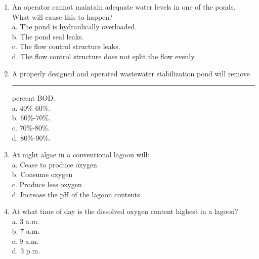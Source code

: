 \begin{tcolorbox}[breakable, enhanced,
colframe=blue!25,
colback=blue!10,
coltitle=blue!20!black,  
title= Chapter Assessment]
\begin{enumerate}
e. None of the above. \\


\item  An operator cannot maintain adequate water levels in one of the ponds. What will cause this to happen? \\


a. The pond is hydraulically overloaded. \\

b. The pond seal leaks. \\

c. The flow control structure leaks. \\

d. The flow control structure does not split the flow evenly. \\


\item  A properly designed and operated wastewater stabilization pond will remove \rule{1.5cm}{0.3mm} percent BOD. \\


a. 40\%-60\%. \\

b. 60\%-70\%. \\

c. 70\%-80\%. \\

d. 80\%-90\%. \\


\item  At night algae in a conventional lagoon will: \\


a. Cease to produce oxygen \\

b. Consume oxygen \\

c. Produce less oxygen \\

d. Increase the pH of the lagoon contents \\


\item  At what time of day is the dissolved oxygen content highest in a lagoon? \\


a. 3 a.m. \\

b. 7 a.m. \\

c. 9 a.m. \\

d. 3 p.m. \\
\end{enumerate}
\end{tcolorbox}
